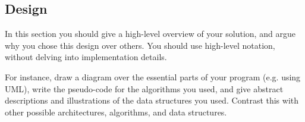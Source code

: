 \subsection{Design}

\label{sec:design}

In this section you should give a high-level overview of your solution, and
argue why you chose this design over others. You should use high-level
notation, without delving into implementation details.

For instance, draw a diagram over the essential parts of your program (e.g.
using UML), write the pseudo-code for the algorithms you used, and give
abstract descriptions and illustrations of the data structures you used.
Contrast this with other possible architectures, algorithms, and data
structures.
